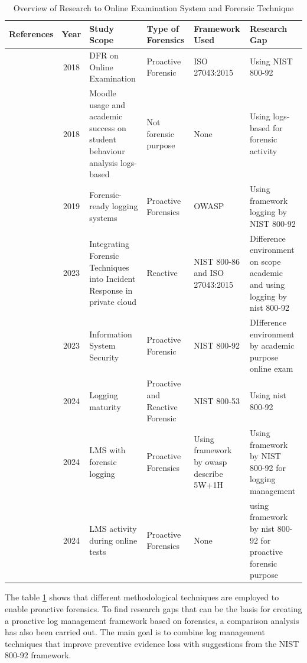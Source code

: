 \begin{table}[H]
\centering
\caption{Overview of Research to Online Examination System and Forensic Technique}
\label{tab:literature-review}
\begin{tabular}{|p{2cm}|c|p{3cm}|p{2cm}|p{2cm}|p{4cm}|}
\hline
\textbf{References}        & \textbf{Year} & \textbf{Study Scope}                     & \textbf{Type of Forensics} & \textbf{Framework Used} & \textbf{Research Gap} \\ \hline
\citet{venter2018digital}  & 2018          & DFR on Online Examination                & Proactive Forensic         & ISO 27043:2015 & Using NIST 800-92 \\ \hline
\citet{kadoic2018analysis} & 2018          & Moodle usage and academic success on student behaviour analysis logs-based   & Not forensic purpose         & None         & Using logs-based for forensic activity   \\ \hline
\citet{rivera2019towards}  & 2019          & Forensic-ready logging systems           & Proactive Forensics        & OWASP & Using framework logging by NIST 800-92 \\ \hline
\citet{febriana2023comparative} & 2023          & Integrating Forensic Techniques into Incident Response in private cloud                   & Reactive        &  NIST 800-86 and ISO 27043:2015 & Difference environment on scope academic and using logging by nist 800-92      \\ \hline
\citet{lakhno2023adaptive}  & 2023 & Information System Security & Proactive Forensic & NIST 800-92 & DIfference environment by academic purpose online exam \\ \hline
\citet{kern2024logging}    & 2024 & Logging maturity & Proactive and Reactive Forensic & NIST 800-53 & Using nist 800-92 \\ \hline
\citet{abd2024enhancing}   & 2024          & LMS with forensic logging                & Proactive Forensics        & Using framework by owasp describe 5W+1H & Using framework by NIST 800-92 for logging management    \\ \hline
\citet{lintang2024log}     & 2024          & LMS activity during online tests         & Proactive Forensics        & None  & using framework by nist 800-92 for proactive forensic purpose     \\ \hline
\end{tabular}
\end{table}

The table \ref{tab:literature-review} shows that different methodological techniques are employed to enable proactive forensics. To find research gaps that can be the basis for creating a proactive log management framework based on forensics, a comparison analysis has also been carried out. The main goal is to combine log management techniques that improve preventive evidence loss with suggestions from the NIST 800-92 framework.


